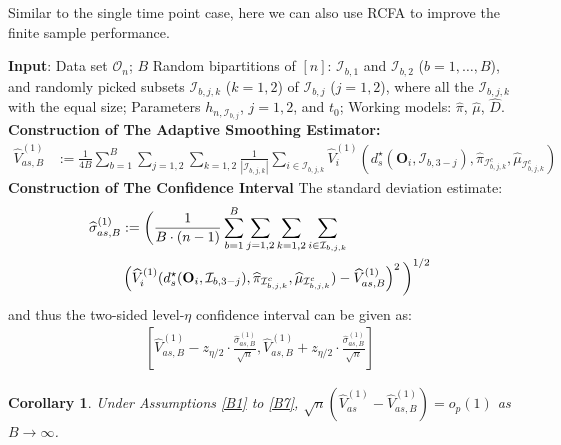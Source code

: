 \documentclass[11pt]{article}
\theoremstyle{referenceplain}
\newtheorem{corollary}{Corollary}[section]
\theoremstyle{referencedefinition}
\theoremstyle{referenceremark}
\begin{document}
Similar to the single time point case, here we can also use RCFA to improve the finite sample performance. 
\begin{algorithm}[H]
\caption{Finite Sample Refinement: Repeatedly Cross Fitting and  Averaging}
    \begin{algorithmic}[1]
        \State \textbf{Input}: Data set $\mathcal{O}_n$; 
$B$ Random bipartitions of $[n]$: $\mathcal{I}_{b,1}$ and $\mathcal{I}_{b,2}$ ($b=1,\dots,B$), and randomly picked subsets $\mathcal{I}_{b,j,k}$ ($k=1,2$) of $\mathcal{I}_{b,j}$ ($j=1,2$), where all the $\mathcal{I}_{b,j,k}$ with the equal size; Parameters $h_{n,\mathcal{I}_{b,j}}$, $j=1,2$, and $t_0$; Working models: $\widehat{\pi}$, $\widehat{\mu}$, $\widehat{D}$.
        \State \textbf{Construction of 
 The Adaptive Smoothing Estimator:} 
 \begin{align}
     \widehat{V}_{as,B}^{(1)}&:= \frac{1}{4B}\sum_{b=1}^B \sum_{j=1,2}\sum_{k=1,2}\frac{1}{|\mathcal{I}_{b,j,k}|}\sum_{i\in\mathcal{I}_{b,j,k}}\widehat{V}_i^{(1)}(d_{s}^\star(\mathbf{O}_i,\mathcal{I}_{b,3-j}),\widehat{\pi}_{\mathcal{I}_{b,j,k}^c},\widehat{\mu}_{\mathcal{I}_{b,j,k}^c})\label{mul-opt-est-cv}
 \end{align}
 \State \textbf{Construction of The Confidence Interval} The standard deviation estimate:
 \begin{align}
     \widehat{\sigma}_{as,B}^{(1)}&:=\bigg(\frac{1}{B\cdot(n-1)}\sum_{b=1}^B\sum_{j=1,2}\sum_{k=1,2}\sum_{i\in\mathcal{I}_{b,j,k}}\notag\\&\left(\widehat{V}_i^{(1)}(d_{s}^\star(\mathbf{O}_i,\mathcal{I}_{b,3-j}),\widehat{\pi}_{\mathcal{I}_{b,j,k}^c},\widehat{\mu}_{\mathcal{I}_{b,j,k}^c})-\widehat{V}_{as,B}^{(1)}\right)^2\bigg)^{1/2}\label{mul-opt-std-cv}
 \end{align}
 and thus the two-sided level-{$\eta$} confidence interval can be given as:
\begin{align}\label{mul-CI-opt-cv}
     \left[\widehat{V}_{as,B}^{(1)}-{z_{\eta/2}}\cdot\frac{\widehat{\sigma}_{as,B}^{(1)}}{\sqrt{n}},\widehat{V}_{as,B}^{(1)}+{z_{\eta/2}}\cdot\frac{\widehat{\sigma}_{as,B}^{(1)}}{\sqrt{n}}\right]
 \end{align}
    \end{algorithmic}
\end{algorithm}
\begin{corollary}\label{corob7}
    Under Assumptions \ref{B1} to \ref{B7}, $\sqrt{n}\left(\widehat{V}_{as}^{(1)}-\widehat{V}_{as,B}^{(1)}\right)=o_p(1)$ as $B\to\infty$.
\end{corollary}
\end{document}

